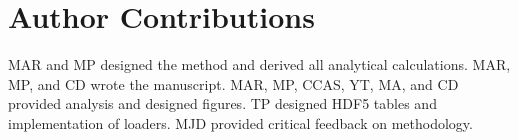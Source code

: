 % 
% 
% 
% 

\section*{Author Contributions}
MAR and MP designed the method and derived all analytical calculations. MAR, MP, and CD wrote the manuscript. MAR, MP, CCAS, YT, MA, and CD provided analysis and designed figures. TP designed HDF5 tables and implementation of loaders. MJD provided critical feedback on methodology.

